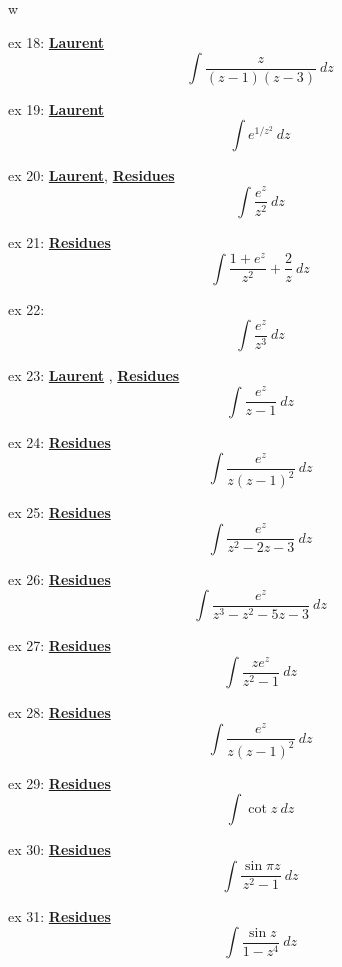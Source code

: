 w\documentclass[11pt, oneside]{article}
\begin{document}
ex 18:  \hyperref[sec:ex18L]{\textbf{Laurent}}
\[ \int \frac{z}{(z - 1)(z - 3)} \ dz \]

ex 19:  \hyperref[sec:ex19L]{\textbf{Laurent}}
\[ \int e^{1/z^2} \ dz \]

ex 20:  \hyperref[sec:ex20L]{\textbf{Laurent}},  \hyperref[sec:ex20R]{\textbf{Residues}}
\[ \int \frac{e^z}{z^2} \ dz \]

ex 21:  \hyperref[sec:ex21R]{\textbf{Residues}}
\[ \int \frac{1 + e^z}{z^2} + \frac{2}{z} \ dz \]

ex 22:  
\[ \int \frac{e^z}{z^3} \ dz \]

ex 23:  \hyperref[sec:ex23L]{\textbf{Laurent}} ,  \hyperref[sec:ex23R]{\textbf{Residues}}
\[ \int \frac{e^z}{z - 1} \ dz \]

ex 24:   \hyperref[sec:ex24R]{\textbf{Residues}} 
\[ \int \frac{e^z}{z(z - 1)^2} \ dz \]

ex 25:    \hyperref[sec:ex25R]{\textbf{Residues}}
\[ \int \frac{e^z}{z^2 - 2z - 3} \ dz \]

ex 26:   \hyperref[sec:ex26R]{\textbf{Residues}}
\[ \int \frac{e^z}{z^3 - z^2 - 5z - 3} \ dz \]

ex 27:   \hyperref[sec:ex27R]{\textbf{Residues}} 
\[ \int \frac{z e^z}{z^2 - 1} \ dz \]

ex 28:  \hyperref[sec:ex28R]{\textbf{Residues}}
\[ \int \frac{e^z}{z(z - 1)^2} \ dz \]

ex 29:  \hyperref[sec:ex29R]{\textbf{Residues}}
\[ \int \cot z \ dz \]

ex 30:  \hyperref[sec:ex30R]{\textbf{Residues}}  
\[ \int \frac{\sin \pi z}{z^2 - 1} \ dz \]

ex 31:    \hyperref[sec:ex31R]{\textbf{Residues}}  
\[ \int \frac{\sin z}{1 - z^4} \ dz \]
\end{document}
